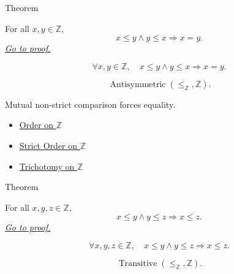 \begin{theorembox}{Theorem}
\begin{theorem}
\label{thm:order-on-z-antisymmetric}
For all $x,y\in\mathbb{Z}$,
\[
x\le y\land y\le x \Longrightarrow x=y.
\]
\hyperref[prf:order-on-z-antisymmetric]{\textit{Go to proof.}}
\end{theorem}
\end{theorembox}

\begin{remark*}
\[
\forall x,y\in\mathbb{Z},\quad
x\le y\land y\le x \Longrightarrow x=y.
\]
\end{remark*}

\begin{remark*}
\[
\operatorname{Antisymmetric}(\le_{\mathbb{Z}},\mathbb{Z}).
\]
\end{remark*}

\begin{remark*}[Interpretation]
Mutual non-strict comparison forces equality.
\end{remark*}

\begin{dependencies}
\begin{itemize}
  \item \hyperref[def:order-on-z]{Order on $\mathbb{Z}$}
  \item \hyperref[def:strict-order-on-z]{Strict Order on $\mathbb{Z}$}
  \item \hyperref[thm:trichotomy-on-z]{Trichotomy on $\mathbb{Z}$}
\end{itemize}
\end{dependencies}

\begin{theorembox}{Theorem}
\begin{theorem}
\label{thm:order-on-z-transitive}
For all $x,y,z\in\mathbb{Z}$,
\[
x\le y\land y\le z \Longrightarrow x\le z.
\]
\hyperref[prf:order-on-z-transitive]{\textit{Go to proof.}}
\end{theorem}
\end{theorembox}

\begin{remark*}
\[
\forall x,y,z\in\mathbb{Z},\quad
x\le y\land y\le z \Longrightarrow x\le z.
\]
\end{remark*}

\begin{remark*}
\[
\operatorname{Transitive}(\le_{\mathbb{Z}},\mathbb{Z}).
\]
\end{remark*}

